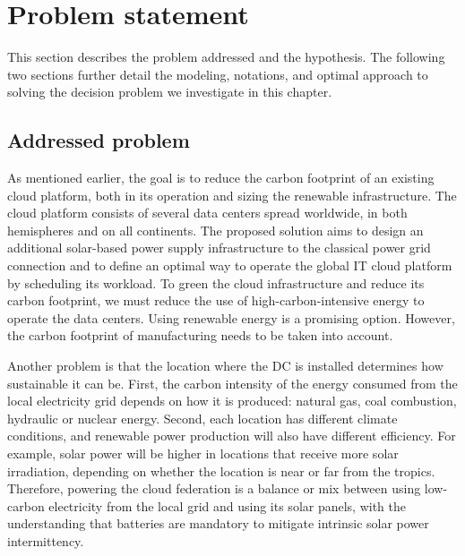 \section{Problem statement}
\label{sec:problemStatement_ccgrid}

This section describes the problem addressed and the hypothesis. The following two sections further detail the modeling, notations, and optimal approach to solving the decision problem we investigate in this chapter.


\subsection{Addressed problem}
\label{sec:addressedproblem_ccgrid}

As mentioned earlier, the goal is to reduce the carbon footprint of an existing cloud platform, both in its operation and sizing the renewable infrastructure. The cloud platform consists of several data centers spread worldwide, in both hemispheres and on all continents. The proposed solution aims to design an additional solar-based power supply infrastructure to the classical power grid connection and to define an optimal way to operate the global IT cloud platform by scheduling its workload. To green the cloud infrastructure and reduce its carbon footprint, we must reduce the use of high-carbon-intensive energy to operate the data centers. Using renewable energy is a promising option. However, the carbon footprint of manufacturing needs to be taken into account.


Another problem is that the location where the DC is installed determines how sustainable it can be. First, the carbon intensity of the energy consumed from the local electricity grid depends on how it is produced: natural gas, coal combustion, hydraulic or nuclear energy. Second, each location has different climate conditions, and renewable power production will also have different efficiency. For example, solar power will be higher in locations that receive more solar irradiation, depending on whether the location is near or far from the tropics. Therefore, powering the cloud federation is a balance or mix between using low-carbon electricity from the local grid and using its solar panels, with the understanding that batteries are mandatory to mitigate intrinsic solar power intermittency.


